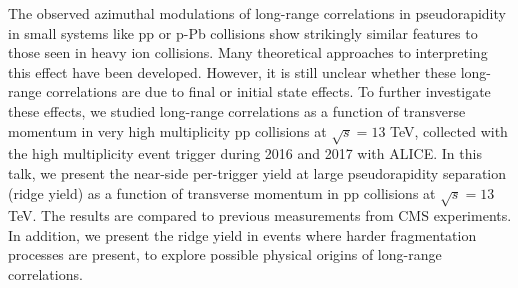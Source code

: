 The observed azimuthal modulations of long-range correlations in pseudorapidity in small systems like pp or p-Pb collisions show strikingly similar features to those seen in heavy ion collisions. Many theoretical approaches to interpreting this effect have been developed. However, it is still unclear whether these long-range correlations are due to final or initial state effects. To further investigate these effects, we studied long-range correlations as a function of transverse momentum in very high multiplicity pp collisions at $\sqrt{s} =13$ TeV, collected with the high multiplicity event trigger during 2016 and 2017 with ALICE. In this talk, we present the near-side per-trigger yield at large pseudorapidity separation (ridge yield) as a function of transverse momentum in pp collisions at $\sqrt{s} =13$ TeV. The results are compared to previous measurements from CMS experiments. In addition, we present the ridge yield in events where harder fragmentation processes are present, to explore possible physical origins of long-range correlations.

